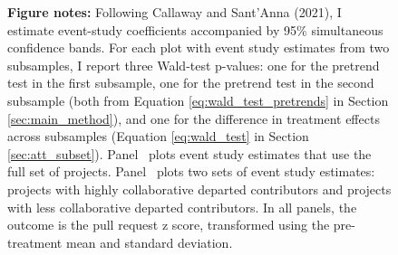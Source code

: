 \begin{figure}[htbp]
\begin{minipage}[b]{0.49\textwidth}
    \end{minipage}
  \vspace{1ex}
  \centering
  \begin{minipage}{1\textwidth}
    \textbf{Figure notes:} 
    Following Callaway and Sant’Anna (2021), I estimate event-study coefficients accompanied by 95\% simultaneous confidence bands. For each plot with event study estimates from two subsamples, I report three Wald-test p-values: one for the pretrend test in the first subsample, one for the pretrend test in the second subsample (both from Equation \ref{eq:wald_test_pretrends} in Section \ref{sec:main_method}), and one for the difference in treatment effects across subsamples (Equation \ref{eq:wald_test} in Section \ref{sec:att_subset}). Panel~ plots event study estimates that use the full set of projects. Panel~ plots two sets of event study estimates: projects with highly collaborative departed contributors and projects with less collaborative departed contributors. In all panels, the outcome is the pull request z score, transformed using the pre-treatment mean and standard deviation.
  \end{minipage}


\end{figure}
